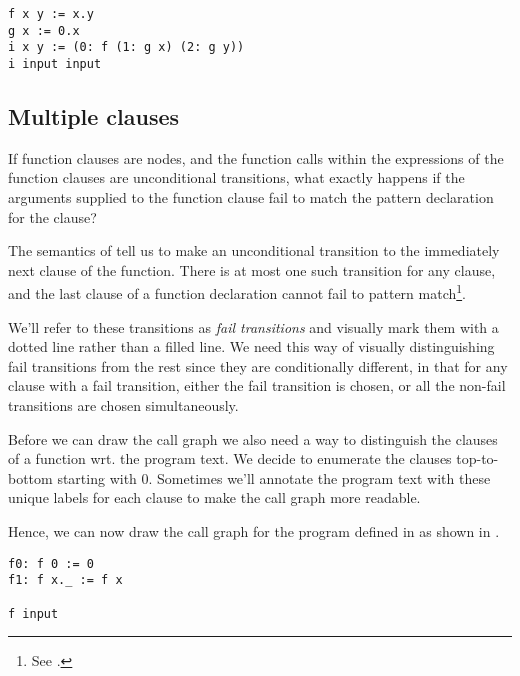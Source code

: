 \begin{lstlisting}[label=listing:cfg-sample-2,caption={A sample \D{} program, always returning \mono{(0.x).(0.y)}, where \mono{x} and \mono{y} are arbitrary \D{} values supplied by the user.}]
f x y := x.y
g x := 0.x
i x y := (0: f (1: g x) (2: g y))
i input input
\end{lstlisting}



\subsection{Multiple clauses}

If function clauses are nodes, and the function calls within the expressions of
the function clauses are unconditional transitions, what exactly happens if the
arguments supplied to the function clause fail to match the pattern declaration
for the clause?

The semantics of \D{} tell us to make an unconditional transition to the
immediately next clause of the function. There is at most one such transition
for any clause, and the last clause of a function declaration cannot fail to
pattern match\footnote{See .}.

We'll refer to these transitions as \emph{fail transitions} and visually mark
them with a dotted line rather than a filled line. We need this way of visually
distinguishing fail transitions from the rest since they are conditionally
different, in that for any clause with a fail transition, either the fail
transition is chosen, or all the non-fail transitions are chosen
simultaneously.

Before we can draw the call graph we also need a way to distinguish the clauses
of a function wrt. the program text. We decide to enumerate the clauses
top-to-bottom starting with 0. Sometimes we'll annotate the program text with
these unique labels for each clause to make the call graph more readable.

Hence, we can now draw the call graph for the program defined in
 as shown in .

\begin{lstlisting}[label=listing:cfg-loop,caption={A simple, down-counting loop in \D{}.}]
f0: f 0 := 0
f1: f x._ := f x

f input
\end{lstlisting}

 

